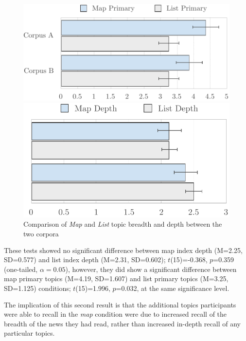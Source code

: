 \begin{figure}[h]
\centering
\begin{minipage}{.5\textwidth}
  \centering
  \includegraphics[height=.49\linewidth]{img/evaluation/primary.pdf}
  \end{minipage}%
\begin{minipage}{.5\textwidth}
  \centering
  \includegraphics[height=.49\linewidth]{img/evaluation/depth}
\end{minipage}
	\caption{Comparison of \textit{Map} and \textit{List} topic breadth and depth between the two corpora}
  \label{fig:depthbreadth}
\end{figure}

These tests showed no significant difference between map index depth (M=2.25, SD=0.577) and list index depth (M=2.31, SD=0.602); $t$(15)=-0.368, $p$=0.359 (one-tailed, $\alpha=0.05$), however, they did show a significant difference between map primary topics (M=4.19, SD=1.607) and list primary topics (M=3.25, SD=1.125) conditions; $t$(15)=1.996, $p$=0.032, at the same significance level.

The implication of this second result is that the additional topics participants were able to recall in the \textit{map} condition were due to increased recall of the breadth of the news they had read, rather than increased in-depth recall of any particular topics.

